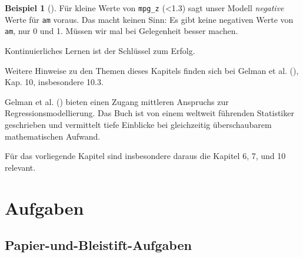 \documentclass[
  ngerman,
  letterpaper,
  twoside,
  open=any]{scrbook}
\theoremstyle{definition}
\newtheorem{example}{Beispiel}[chapter]
\theoremstyle{plain}
\theoremstyle{definition}
\theoremstyle{definition}
\theoremstyle{remark}
\begin{document}
\begin{example}[]
Für kleine Werte von \texttt{mpg\_z} (\textless1.3) sagt unser Modell
\emph{negative} Werte für \texttt{am} voraus. Das macht keinen Sinn: Es
gibt keine negativen Werte von \texttt{am}, nur 0 und 1. Müssen wir mal
bei Gelegenheit besser machen.

\begin{tcolorbox}[enhanced jigsaw, arc=.35mm, bottomrule=.15mm, bottomtitle=1mm, breakable, colback=white, colbacktitle=quarto-callout-important-color!10!white, colframe=quarto-callout-important-color-frame, coltitle=black, left=2mm, leftrule=.75mm, opacityback=0, opacitybacktitle=0.6, rightrule=.15mm, title=\textcolor{quarto-callout-important-color}{\faExclamation}\hspace{0.5em}{Wichtig}, titlerule=0mm, toprule=.15mm, toptitle=1mm]

Kontinuierliches Lernen ist der Schlüssel zum Erfolg.

\end{tcolorbox}

Weitere Hinweise zu den Themen dieses Kapitels finden sich bei Gelman et
al. (), Kap. 10, insbesondere 10.3.

Gelman et al. () bieten einen Zugang
mittleren Anspruchs zur Regressionsmodellierung. Das Buch ist von einem
weltweit führenden Statistiker geschrieben und vermittelt tiefe
Einblicke bei gleichzeitig überschaubarem mathematischen Aufwand.

Für das vorliegende Kapitel sind insbesondere daraus die Kapitel 6, 7,
und 10 relevant.

\section{Aufgaben}\label{aufgaben-10}

\subsection{Papier-und-Bleistift-Aufgaben}\label{papier-und-bleistift-aufgaben-4}


\end{example}
\end{document}
